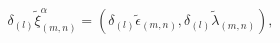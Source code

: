 \begin{equation*}
\delta _{(l)}\tilde{\xi}_{(m,n)}^{\alpha }=(\delta _{(l)}\tilde{\epsilon}%
_{(m,n)},\delta _{(l)}\tilde{\lambda}_{(m,n)}),
\end{equation*}

